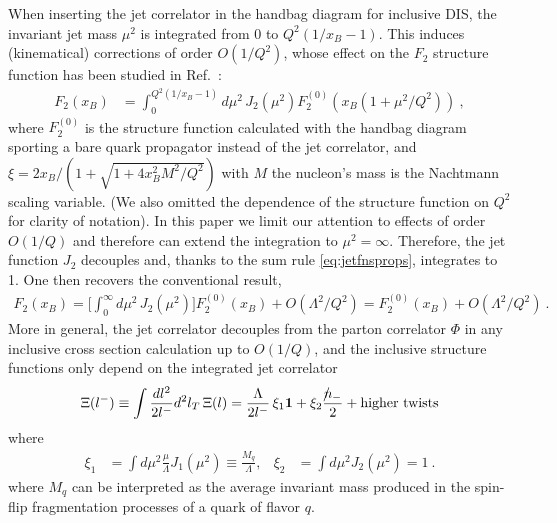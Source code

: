 \documentclass[preprintnumbers,floatfix,nofootinbib]{revtex4}
\newcommand{\nslash}{n \hspace{-0.24cm} / \,}
\newcommand{\mj}{M_q}
\newcommand{\mjs}{\langle m_j^2 \rangle>}
\begin{document}
When inserting the jet correlator in the handbag diagram for inclusive DIS, the invariant jet mass $\mu^2$ is integrated from 0 to $Q^2(1/x_B-1)$. This induces (kinematical) corrections of order $O(1/Q^2)$, whose effect on the $F_2$ structure function has been studied in Ref.~\cite{Accardi:2008ne}:
\begin{align}
  F_2(x_B) & = \int_0^{Q^2(1/x_B-1)}d\mu^2\, J_2(\mu^2) F_2^{(0)}(x_B(1+\mu^2/Q^2)) \ ,
\label{eq:F2}
\end{align}
where $F_2^{(0)}$ is the structure function calculated with the handbag
diagram sporting a bare quark propagator instead of the jet correlator, and
$\xi=2x_B/(1+\sqrt{1+4x_B^2M^2/Q^2})$ with $M$ the nucleon's mass is the
Nachtmann scaling variable. (We also omitted the dependence of the structure
function on $Q^2$ for clarity of notation). In this paper we limit our
attention to effects of order $O(1/Q)$ and therefore can extend the
integration to $\mu^2=\infty$. Therefore, the jet function $J_2$ decouples
and, thanks to the sum rule \eqref{eq:jetfnsprops}, integrates to 1. One then
recovers the conventional result, 
\begin{align}
  F_2(x_B) = \Big[ \int_0^\infty d\mu^2\, J_2(\mu^2) \Big] F_2^{(0)}(x_B) 
     + O(\Lambda^2/Q^2) = F_2^{(0)}(x_B)  + O(\Lambda^2/Q^2) \ .
\end{align}
%
More in general, the jet correlator decouples from the parton correlator $\Phi$ in any inclusive cross section calculation up to $O(1/Q)$, and the inclusive structure functions only depend on the integrated jet correlator 
\begin{equation} 
  \Xi(l^-) \equiv \int \frac{dl^2}{2l^-} d^2 l_T \, \Xi(l) 
    =  \frac{\Lambda}{2 l^-}\,\xi_1 {\bm 1}
    +  \xi_2 \frac{\nslash_-}{2} 
    + \text{higher\ twists}
\end{equation} 
where 
\begin{align}
\xi_1 &= \int d\mu^2 \frac{\mu}{\Lambda} J_1(\mu^2) 
       \equiv \frac{\mj}{\Lambda},
&
\xi_2 &= \int d\mu^2 J_2(\mu^2) = 1 \ .
\end{align} 
where $\mj$ can be interpreted as the average invariant mass produced in the spin-flip fragmentation processes of a quark of flavor $q$.
\end{document}
